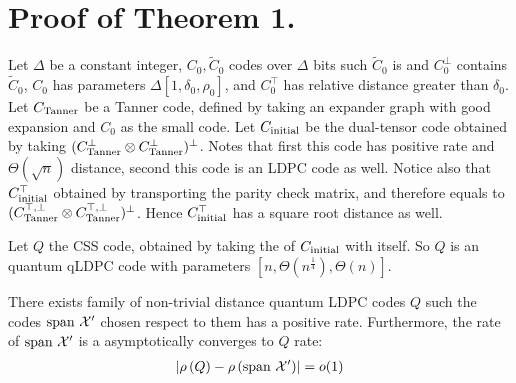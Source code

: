 \documentclass[manuscript,screen,review]{acmart}
\begin{document}
\section{Proof of Theorem 1.}
\begin{definition}
  Let $\Delta$ be a constant integer, $C_{0},\tilde{C}_{0}$ codes over $\Delta$ bits such $\tilde{C}_{0}$ is \trig and $C^{\perp}_{0}$ contains $\tilde{C}_{0}$, $C_{0}$ has parameters $\Delta[1,\delta_{0},\rho_{0}]$, and $C_{0}^\top$ has relative distance greater than $\delta_{0}$. Let $C_{\text{Tanner}}$ be a Tanner code, defined by taking an expander graph with good expansion and $C_{0}$ as the small code. Let $C_{\text{initial}}$ be the dual-tensor code obtained by taking $(C_{\text{Tanner}}^\perp \otimes C_{\text{Tanner}}^\perp )^\perp$. Notes that first this code has positive rate and $\Theta(\sqrt{n})$ distance, second this code is an LDPC code as well. Notice also that $C_{\text{initial}}^{\top}$ obtained by transporting the parity check matrix, and therefore equals to  $(C_{\text{Tanner}}^{\top, \perp} \otimes C_{\text{Tanner}}^{\top, \perp} )^\perp$. Hence $C_{\text{initial}}^{\top}$ has a square root distance as well.

  Let $Q$ the CSS code, obtained by taking the \Hyp of $C_{\text{initial}}$ with itself. So $Q$ is an quantum qLDPC code with parameters $[n, \Theta(n^{\frac{1}{4}}), \Theta(n)]$.
\end{definition}
\begin{claim}
  There exists family of non-trivial distance quantum LDPC codes $Q$ such the codes $\text{span }\mathcal{X}^\prime$ chosen respect to them has a positive rate. Furthermore, the rate of $\text{span }\mathcal{X}^\prime$ is a asymptotically converges to $Q$ rate:
  \begin{equation*}
    \begin{split}
      \left| \rho\left(Q\right) - \rho\left(\text{span }\mathcal{X}^\prime\right) \right| = o(1)
    \end{split}
  \end{equation*}
\end{claim}
\end{document}
